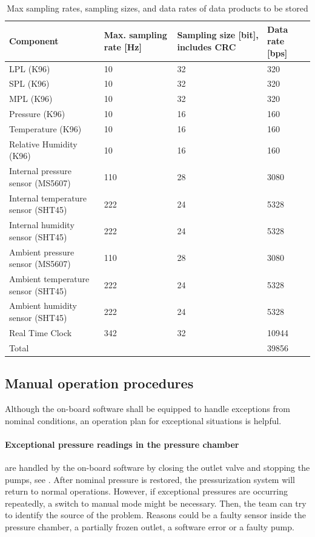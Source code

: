 \begin{table}[H]
\centering
\caption{Max sampling rates, sampling sizes, and data rates of data products to be stored}
\label{tab:data_rates}
\begin{tabular}{p{7cm}p{2cm}p{2cm}p{2cm}}
\toprule
\textbf{Component} & \textbf{Max. sampling rate [Hz]} & \textbf{Sampling size [bit], includes CRC} & \textbf{Data rate [bps]} \\
\midrule
LPL (K96) & 10 & 32 & 320\\
SPL (K96) & 10 & 32 & 320\\
MPL (K96) & 10 & 32 & 320\\
Pressure (K96) & 10 & 16 & 160\\
Temperature (K96) & 10 & 16 & 160\\
Relative Humidity (K96) & 10 & 16 & 160\\
Internal pressure sensor (MS5607) & 110 & 28 & 3080 \\
Internal temperature sensor (SHT45) & 222 & 24 & 5328 \\
Internal humidity sensor (SHT45) & 222 & 24 & 5328 \\
Ambient pressure sensor (MS5607) & 110 & 28 & 3080 \\
Ambient temperature sensor (SHT45) & 222 & 24 & 5328 \\
Ambient humidity sensor (SHT45) & 222 & 24 & 5328 \\
Real Time Clock & 342 & 32 & 10944\\
\midrule
Total & & & 39856 \\
\bottomrule
\end{tabular}
\end{table}


\subsection{Manual operation procedures}
Although the on-board software shall be equipped to handle exceptions from nominal conditions, an operation plan for exceptional situations is helpful. 

\paragraph{Exceptional pressure readings in the pressure chamber} are handled by the on-board software by closing the outlet valve and stopping the pumps, see .
After nominal pressure is restored, the pressurization system will return to normal operations. 
However, if exceptional pressures are occurring repeatedly, a switch to manual mode might be necessary. 
Then, the team can try to identify the source of the problem.
Reasons could be a faulty sensor inside the pressure chamber, a partially frozen outlet, a software error or a faulty pump.\par 

